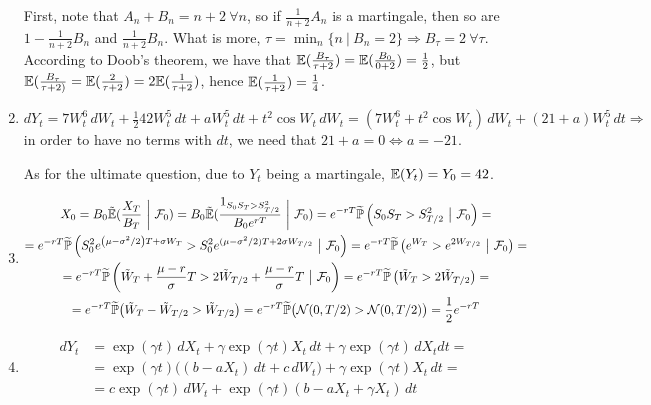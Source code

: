 \documentclass[12pt, a4paper]{article}
\newcommand{\cF}{\mathcal{F}}
\newcommand{\cN}{\mathcal{N}}
\begin{document}
\begin{enumerate}
First, note that $A_n + B_n = n + 2\ \forall n$, so if $\frac{1}{n+2} A_n$ is a martingale, then so are $1 - \frac{1}{n+2} B_n$ and $\frac{1}{n+2} B_n$. What is more, $\tau = \min_n \{n\ |\ B_n = 2\} \Rightarrow B_\tau = 2\ \forall \tau$. According to Doob's theorem, we have that $\mathbb{E}(\frac{B_\tau}{\tau + 2}) = \mathbb{E}(\frac{B_0}{0 + 2}) = \frac{1}{2}$, but $\mathbb{E}(\frac{B_\tau}{\tau + 2)} = \mathbb{E}(\frac{2}{\tau + 2}) = 2 \mathbb{E}(\frac{1}{\tau + 2})$, hence $\mathbb{E}(\frac{1}{\tau + 2}) = \frac{1}{4}$.

\item
$dY_t = 7W_t^6 \,dW_t + \frac{1}{2} 42W_t^5 \,dt + a W_t^5 \,dt + t^2 \cos W_t \,dW_t = \left(7W_t^6 + t^2 \cos W_t\right) \,dW_t + (21 + a) W_t^5 \,dt \Rightarrow$ in order to have no terms with $dt$, we need that $21 + a = 0 \Leftrightarrow a = -21$.

As for the ultimate question, due to $Y_t$ being a martingale, $\mathbb{E}(Y_t) = Y_0 = 42$.

\item
\begin{multline*}
	X_0 = B_0 \tilde\E(\frac{X_T}{B_T}\ \bigg|\ \cF_0) = B_0 \tilde\E(\frac{1_{S_0 S_T > S_{T/2}^2}}{B_0 e^{rT}}\ \bigg|\ \cF_0) = e^{-rT} \widetilde{\P}\left(S_0 S_T > S_{T/2}^2\ \big|\ \cF_0\right) =\\
	= e^{-rT} \widetilde{\P}\left(S_0^2 e^{\left(\mu - \sigma^2/2\right) T + \sigma W_T} > S_{0}^2 e^{(\mu - \sigma^2/2) T + 2\sigma W_{T/2}}\ \big|\ \cF_0\right) = e^{-rT} \widetilde{\P}\left(e^{W_T} > e^{2W_{T/2}}\ \big|\ \cF_0\right) =\\
	= e^{-rT} \widetilde{\P}\left(\tilde{W}_T + \frac{\mu - r}{\sigma} T > 2\tilde{W}_{T/2} + \frac{\mu - r}{\sigma} T\ \big|\ \cF_0\right) = e^{-rT} \widetilde{\P}\left(\tilde{W}_T > 2\tilde{W}_{T/2}\right) =\\= e^{-rT} \widetilde{\P}\big(\tilde{W}_T - \tilde{W}_{T/2} > \tilde{W}_{T/2}\big) = e^{-rT} \widetilde{\P}\big(\cN(0,T/2) > \cN(0,T/2)\big) = \frac{1}{2} e^{-rT}
\end{multline*}

\item

\begin{align*}
dY_t &= \exp(\gamma t) \,dX_t + \gamma \exp(\gamma t) X_t \,dt + \gamma \exp(\gamma t) \,dX_t dt =\\
&= \exp(\gamma t) \big((b - aX_t) \,dt + c \,dW_t\big) + \gamma \exp(\gamma t) X_t \,dt =\\
&= c \exp(\gamma t) \,dW_t + \exp(\gamma t) (b - aX_t + \gamma X_t) \,dt
\end{align*}


\end{enumerate}
\end{document}
